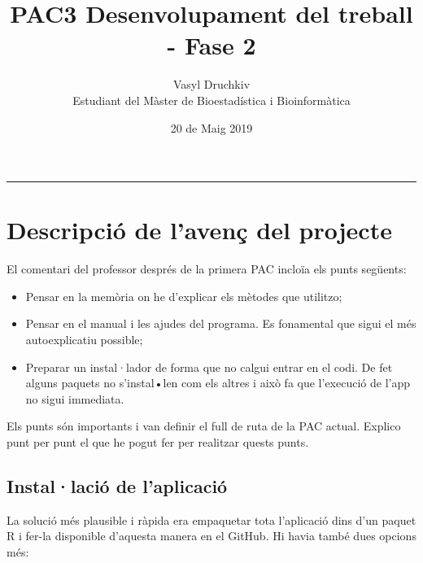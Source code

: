 \documentclass[]{article}
\title{PAC3 Desenvolupament del treball - Fase 2}
\date{20 de Maig 2019}
\author{Vasyl Druchkiv \\ Estudiant del Màster de Bioestadística i Bioinformàtica}
\begin{document}
\maketitle
\makeatletter

\makeatother
\begin{spacing}{0.1}
\tableofcontents
\end{spacing}

\begin{center}
\noindent\rule{8cm}{0.4pt}
\end{center}

\section{Descripció de l'avenç del projecte} 
El comentari del professor després de la primera PAC incloïa els punts següents:

\begin{itemize}
\item Pensar en la memòria on he d'explicar els mètodes que utilitzo;

\item Pensar en el manual i les ajudes del programa. Es fonamental que sigui el més autoexplicatiu possible;

\item Preparar un instal·lador de forma que no calgui entrar en el codi. De fet alguns paquets no s'instal•len com els altres i això fa que l'execució de l'app no sigui immediata.

\end{itemize}

Els punts són importants i van definir el full de ruta de la PAC actual. Explico punt per punt el que he pogut fer per realitzar quests punts.

\subsection{Instal·lació de l'aplicació}

La solució més plausible i ràpida era empaquetar tota l'aplicació dins d'un paquet R i fer-la disponible d'aquesta manera en el GitHub. Hi havia també dues opcions més: 
\end{document}
